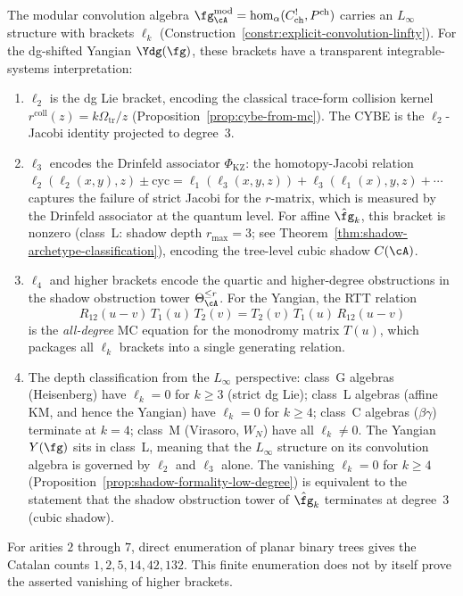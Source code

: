 \begin{remark}
\label{rem:linfty-yangian-deformation}
The modular convolution algebra
$\fg^{\mathrm{mod}}_\cA = \operatorname{hom}_\alpha(C^!_{\mathrm{ch}},
P^{\mathrm{ch}})$
carries an $L_\infty$ structure with brackets $\ell_k$
(Construction~\ref{constr:explicit-convolution-linfty}). For the
dg-shifted Yangian $\Ydg(\fg)$, these brackets have a transparent
integrable-systems interpretation:
\begin{enumerate}[label=\textup{(\roman*)}]
\item $\ell_2$ is the dg Lie bracket, encoding the classical
 trace-form collision kernel
 $r^{\mathrm{coll}}(z)=k\Omega_{\mathrm{tr}}/z$
 (Proposition~\ref{prop:cybe-from-mc}). The CYBE is the
 $\ell_2$-Jacobi identity projected to degree~$3$.
\item $\ell_3$ encodes the Drinfeld associator $\Phi_{\mathrm{KZ}}$:
 the homotopy-Jacobi relation
 $\ell_2(\ell_2(x,y),z) \pm \text{cyc} = \ell_1(\ell_3(x,y,z))
 + \ell_3(\ell_1(x), y, z) + \cdots$
 captures the failure of strict Jacobi for the $r$-matrix,
 which is measured by the Drinfeld associator at the quantum
 level. For affine $\hat\fg_k$, this bracket is nonzero
 (class~L: shadow depth $r_{\max} = 3$; see
 Theorem~\ref{thm:shadow-archetype-classification}), encoding
 the tree-level cubic shadow $C(\cA)$.
\item $\ell_4$ and higher brackets encode the quartic and
 higher-degree obstructions in the shadow obstruction tower
 $\Theta_\cA^{\le r}$. For the Yangian, the RTT relation
 \[
 R_{12}(u - v)\, T_1(u)\, T_2(v)
 = T_2(v)\, T_1(u)\, R_{12}(u - v)
 \]
 is the \emph{all-degree} MC equation for the monodromy matrix
 $T(u)$, which packages all $\ell_k$ brackets into a single
 generating relation.
\item The depth classification from the $L_\infty$ perspective:
 class~G algebras (Heisenberg) have $\ell_k = 0$ for $k \ge 3$
 (strict dg Lie); class~L algebras (affine KM, and hence the
 Yangian) have $\ell_k = 0$ for $k \ge 4$; class~C algebras
 ($\beta\gamma$) terminate at $k = 4$; class~M (Virasoro, $W_N$)
 have all $\ell_k \neq 0$. The Yangian $Y(\fg)$ sits in
 class~L, meaning that the $L_\infty$ structure on its convolution
 algebra is governed by $\ell_2$ and $\ell_3$ alone.
 The vanishing $\ell_k = 0$ for $k \ge 4$
 (Proposition~\ref{prop:shadow-formality-low-degree}) is equivalent
 to the statement that the shadow obstruction tower of $\hat\fg_k$ terminates
 at degree~$3$ (cubic shadow).
\end{enumerate}
For arities $2$ through $7$, direct enumeration of planar binary trees
gives the Catalan counts $1,2,5,14,42,132$.  This finite enumeration
does not by itself prove the asserted vanishing of higher brackets.
\end{remark}

